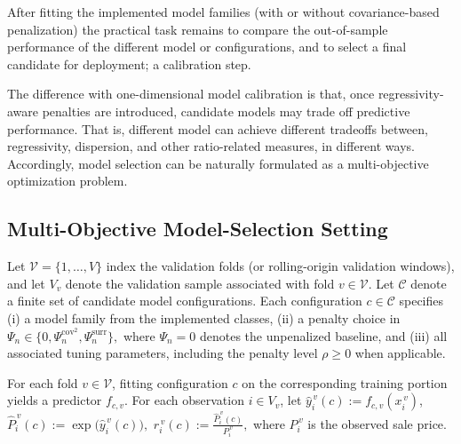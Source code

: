\documentclass[12pt, draft]{article}
\theoremstyle{plain}
\theoremstyle{definition}
\newcommand{\1}{\mathbf{1}}
\begin{document}
{ After fitting the implemented model families (with or without covariance-based penalization) the practical task remains to compare the out-of-sample performance of the different model or configurations, and to select a final candidate for deployment; a calibration step.
 
The difference with one-dimensional model calibration is that, once regressivity-aware penalties are introduced, candidate models may trade off predictive performance. That is, different model can achieve different tradeoffs between, regressivity, dispersion, and other ratio-related measures, in different ways. Accordingly, model selection can be naturally formulated as a multi-objective optimization problem. 




\subsection{Multi-Objective Model-Selection Setting}





Let $\mathcal V=\{1,\dots,V\}$ index the validation folds (or rolling-origin validation windows), and let $V_v$ denote the validation sample associated with fold $v\in\mathcal V$. Let $\mathcal C$ denote a finite set of candidate model configurations. Each configuration $c\in\mathcal C$ specifies
(i) a model family from the implemented classes,
(ii) a penalty choice in
$
\Psi_n \in \{0,\Psi_n^{\mathrm{cov}^2},\Psi_n^{\mathrm{surr}}\},
$
where $\Psi_n=0$ denotes the unpenalized baseline,
and
(iii) all associated tuning parameters, including the penalty level $\rho\ge 0$ when applicable.

For each fold $v\in\mathcal V$, fitting configuration $c$ on the corresponding training portion yields a predictor $f_{c,v}$. For each observation $i\in V_v$, let
$
\hat y_i^{\,v}(c):=f_{c,v}(x_i^{\,v})$, $
\hat P_i^{\,v}(c):=\exp\!\bigl(\hat y_i^{\,v}(c)\bigr),$
$r_i^{\,v}(c):=\frac{\hat P_i^{\,v}(c)}{P_i^{\,v}},
$
where $P_i^{\,v}$ is the observed sale price. 

}
\end{document}
